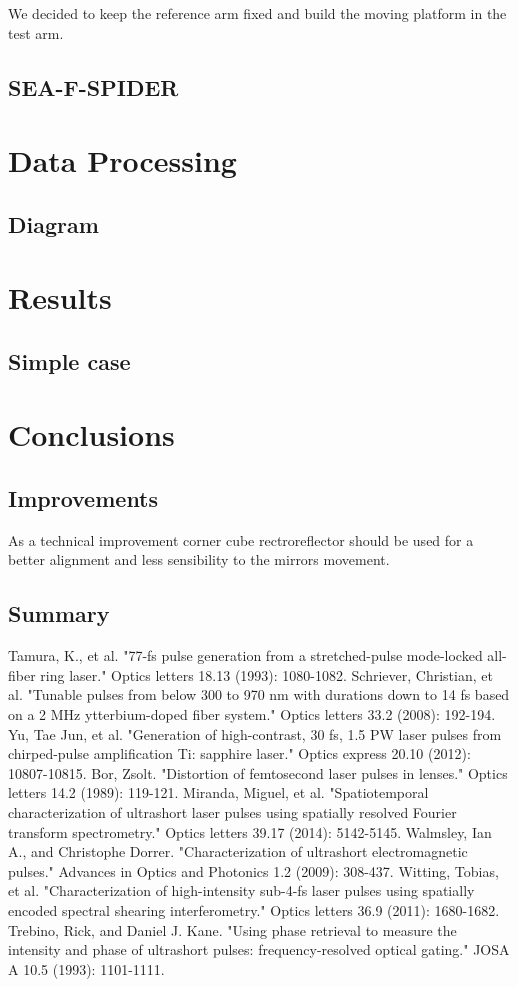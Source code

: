 \documentclass[12pt,a4paper,twoside]{article}
\begin{document}
We decided to keep the reference arm fixed and build the moving platform in the test arm.

\subsection{SEA-F-SPIDER}
\section{Data Processing}
\subsection{Diagram}
\section{Results}
\subsection{Simple case}
\section{Conclusions}
\subsection{Improvements}
As a technical improvement corner cube rectroreflector should be used for a better alignment and less sensibility to the mirrors movement.
\subsection{Summary}

\clearpage
\begin{thebibliography}{99}
 Tamura, K., et al. "77-fs pulse generation from a stretched-pulse mode-locked all-fiber ring laser." Optics letters 18.13 (1993): 1080-1082.
 Schriever, Christian, et al. "Tunable pulses from below 300 to 970 nm with durations down to 14 fs based on a 2 MHz ytterbium-doped fiber system." Optics letters 33.2 (2008): 192-194.
 Yu, Tae Jun, et al. "Generation of high-contrast, 30 fs, 1.5 PW laser pulses from chirped-pulse amplification Ti: sapphire laser." Optics express 20.10 (2012): 10807-10815.
 Bor, Zsolt. "Distortion of femtosecond laser pulses in lenses." Optics letters 14.2 (1989): 119-121.
 Miranda, Miguel, et al. "Spatiotemporal characterization of ultrashort laser pulses using spatially resolved Fourier transform spectrometry." Optics letters 39.17 (2014): 5142-5145.
 Walmsley, Ian A., and Christophe Dorrer. "Characterization of ultrashort electromagnetic pulses." Advances in Optics and Photonics 1.2 (2009): 308-437.
 Witting, Tobias, et al. "Characterization of high-intensity sub-4-fs laser pulses using spatially encoded spectral shearing interferometry." Optics letters 36.9 (2011): 1680-1682.
 Trebino, Rick, and Daniel J. Kane. "Using phase retrieval to measure the intensity and phase of ultrashort pulses: frequency-resolved optical gating." JOSA A 10.5 (1993): 1101-1111.


\end{thebibliography}
\end{document}
